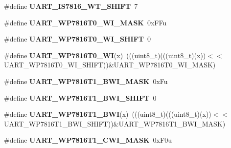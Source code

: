 \begin{DoxyCompactItemize}
\item 
\#define {\bfseries U\+A\+R\+T\+\_\+\+I\+S7816\+\_\+\+W\+T\+\_\+\+S\+H\+I\+FT}~7\hypertarget{group__UART__Register__Masks_ga4d7a1e1c191f1d8114ccef43b758ebfd}{}\label{group__UART__Register__Masks_ga4d7a1e1c191f1d8114ccef43b758ebfd}

\item 
\#define {\bfseries U\+A\+R\+T\+\_\+\+W\+P7816\+T0\+\_\+\+W\+I\+\_\+\+M\+A\+SK}~0x\+F\+Fu\hypertarget{group__UART__Register__Masks_ga0a582c1c952e184c6d89be1827e3c131}{}\label{group__UART__Register__Masks_ga0a582c1c952e184c6d89be1827e3c131}

\item 
\#define {\bfseries U\+A\+R\+T\+\_\+\+W\+P7816\+T0\+\_\+\+W\+I\+\_\+\+S\+H\+I\+FT}~0\hypertarget{group__UART__Register__Masks_gad25ad450ca4c9d163a598ad6781ac8d8}{}\label{group__UART__Register__Masks_gad25ad450ca4c9d163a598ad6781ac8d8}

\item 
\#define {\bfseries U\+A\+R\+T\+\_\+\+W\+P7816\+T0\+\_\+\+WI}(x)~(((uint8\+\_\+t)(((uint8\+\_\+t)(x))$<$$<$U\+A\+R\+T\+\_\+\+W\+P7816\+T0\+\_\+\+W\+I\+\_\+\+S\+H\+I\+FT))\&U\+A\+R\+T\+\_\+\+W\+P7816\+T0\+\_\+\+W\+I\+\_\+\+M\+A\+SK)\hypertarget{group__UART__Register__Masks_ga33967ac259eadac40473fea10ec68f12}{}\label{group__UART__Register__Masks_ga33967ac259eadac40473fea10ec68f12}

\item 
\#define {\bfseries U\+A\+R\+T\+\_\+\+W\+P7816\+T1\+\_\+\+B\+W\+I\+\_\+\+M\+A\+SK}~0x\+Fu\hypertarget{group__UART__Register__Masks_ga9b252b9dd4381388279f30adc107d715}{}\label{group__UART__Register__Masks_ga9b252b9dd4381388279f30adc107d715}

\item 
\#define {\bfseries U\+A\+R\+T\+\_\+\+W\+P7816\+T1\+\_\+\+B\+W\+I\+\_\+\+S\+H\+I\+FT}~0\hypertarget{group__UART__Register__Masks_ga111a16bd25727769c150f337dfbb8da1}{}\label{group__UART__Register__Masks_ga111a16bd25727769c150f337dfbb8da1}

\item 
\#define {\bfseries U\+A\+R\+T\+\_\+\+W\+P7816\+T1\+\_\+\+B\+WI}(x)~(((uint8\+\_\+t)(((uint8\+\_\+t)(x))$<$$<$U\+A\+R\+T\+\_\+\+W\+P7816\+T1\+\_\+\+B\+W\+I\+\_\+\+S\+H\+I\+FT))\&U\+A\+R\+T\+\_\+\+W\+P7816\+T1\+\_\+\+B\+W\+I\+\_\+\+M\+A\+SK)\hypertarget{group__UART__Register__Masks_gaf716107ac91a9a5bc9a1367bf6bfe9a6}{}\label{group__UART__Register__Masks_gaf716107ac91a9a5bc9a1367bf6bfe9a6}

\item 
\#define {\bfseries U\+A\+R\+T\+\_\+\+W\+P7816\+T1\+\_\+\+C\+W\+I\+\_\+\+M\+A\+SK}~0x\+F0u\hypertarget{group__UART__Register__Masks_ga95c5796ae8b5d1bf0db4dcd07801eb16}{}\label{group__UART__Register__Masks_ga95c5796ae8b5d1bf0db4dcd07801eb16}


\end{DoxyCompactItemize}
